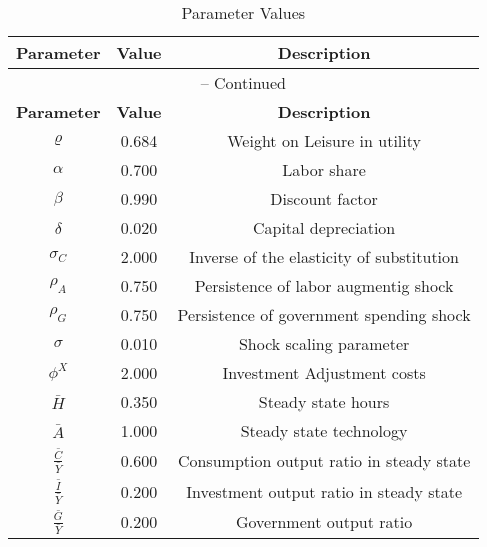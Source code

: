 \begin{center}
\begin{longtable}{ccc}
\caption{Parameter Values}\\%
\toprule%
\multicolumn{1}{c}{\textbf{Parameter}} &
\multicolumn{1}{c}{\textbf{Value}} &
 \multicolumn{1}{c}{\textbf{Description}}\\%
\midrule%
\endfirsthead
\multicolumn{3}{c}{{\tablename} \thetable{} -- Continued}\\%
\midrule%
\multicolumn{1}{c}{\textbf{Parameter}} &
\multicolumn{1}{c}{\textbf{Value}} &
  \multicolumn{1}{c}{\textbf{Description}}\\%
\midrule%
\endhead
${\varrho}$ 	 & 	 0.684 	 & 	 Weight on Leisure in utility\\
${\alpha}$ 	 & 	 0.700 	 & 	 Labor share\\
${\beta}$ 	 & 	 0.990 	 & 	 Discount factor\\
${\delta}$ 	 & 	 0.020 	 & 	 Capital depreciation\\
${\sigma_{C}}$ 	 & 	 2.000 	 & 	 Inverse of the elasticity of substitution\\
${\rho_{A}}$ 	 & 	 0.750 	 & 	 Persistence of labor augmentig shock\\
${\rho_{G}}$ 	 & 	 0.750 	 & 	 Persistence of government spending shock\\
${\sigma}$ 	 & 	 0.010 	 & 	 Shock scaling parameter\\
${\phi^X}$ 	 & 	 2.000 	 & 	 Investment Adjustment costs\\
$\bar{H}$ 	 & 	 0.350 	 & 	 Steady state hours\\
$\bar{A}$ 	 & 	 1.000 	 & 	 Steady state technology\\
$\frac{\bar{C}}{\bar{Y}}$ 	 & 	 0.600 	 & 	 Consumption output ratio in steady state\\
$\frac{\bar{I}}{\bar{Y}}$ 	 & 	 0.200 	 & 	 Investment output ratio in steady state\\
$\frac{\bar{G}}{\bar{Y}}$ 	 & 	 0.200 	 & 	 Government output ratio\\
\bottomrule%
\end{longtable}
\end{center}
